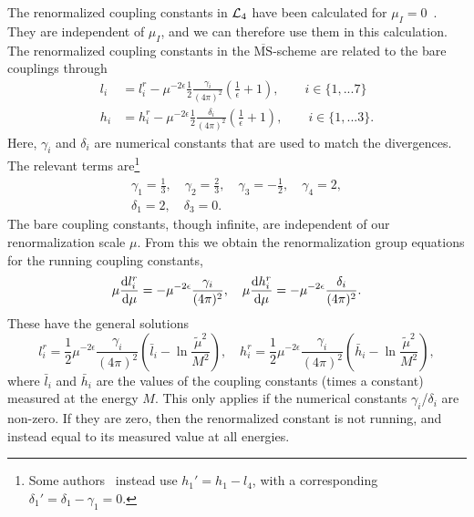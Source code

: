 The renormalized coupling constants in $\mathcal{L}_4$ have been calculated for $\mu_I = 0$~\cite{Gasser-Leutwyler:chiral}.
They are independent of $\mu_I$, and we can therefore use them in this calculation.
The renormalized coupling constants in the $\overline{\mathrm{MS}}$-scheme are related to the bare couplings through
\begin{align}
    l_i 
    & = 
    l_i^r 
    - \mu^{-2\epsilon}\frac{1}{2} \frac{\gamma_i }{(4 \pi)^2} 
    \left(\frac{1}{\epsilon} + 1 \right),
    \quad \quad
    i \in \{1, ... 7\} 
    \\
    h_i 
    & = 
    h_i^r
    - \mu^{-2\epsilon} \frac{1}{2}  \frac{\delta_i }{(4 \pi)^2} 
    \left(\frac{1}{\epsilon} + 1 \right), 
    \quad \quad
    i \in \{1, ... 3\}.
\end{align}
Here, $\gamma_i$ and $\delta_i$ are numerical constants that are used to match the divergences.
The relevant terms are\footnote{Some authors~\cite{Andersen:two-flavor-chpt,GERBER1989387} instead use $h_1' = h_1 - l_4$, with a corresponding $\delta_1' = \delta_1 - \gamma_1 = 0$.}
\begin{gather}
    \gamma_1 = \frac{1}{3}, \quad
    \gamma_2 = \frac{2}{3}, \quad
    \gamma_3 = - \frac{1}{2}, \quad
    \gamma_4 = 2, \\
    \delta_1 = 2, \quad
    \delta_3 = 0.
\end{gather}
The bare coupling constants, though infinite, are independent of our renormalization scale $\mu$.
From this we obtain the renormalization group equations for the running coupling constants,
\begin{equation}
    \mu \diff{l_i^r}{\mu } = - \mu^{-2\epsilon} \frac{\gamma_i }{(4 \pi)^2}, \quad
    \mu \diff{h_i^r}{\mu } = -  \mu^{-2\epsilon}\frac{\delta_i}{(4 \pi)^2}.
\end{equation}
These have the general solutions
\begin{equation}
    l_i^r 
    = \frac{1}{2} \mu^{-2\epsilon} \frac{\gamma_i}{(4 \pi)^2} 
    \left( \bar l_i - \ln{\frac{\tilde \mu^2}{M^2}} \right),
    \quad
    h_i^r 
    = \frac{1}{2} \mu^{-2\epsilon} \frac{\gamma_i}{(4 \pi)^2} 
    \left( \bar h_i - \ln{\frac{\tilde \mu^2}{M^2}} \right),
\end{equation}
where $\bar l_i$ and $\bar h_i$ are the values of the coupling constants (times a constant) measured at the energy $M$.
This only applies if the numerical constants $\gamma_i$/$\delta_i$ are non-zero.
If they are zero, then the renormalized constant is not running, and instead equal to its measured value at all energies.
